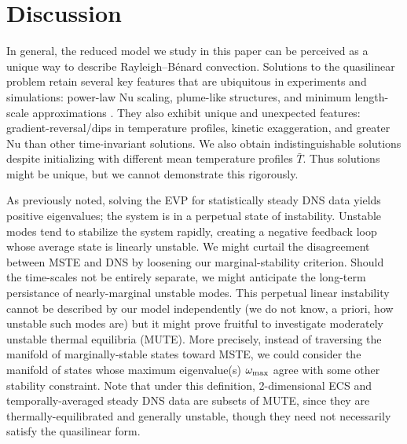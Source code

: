 \documentclass[reprint,amsmath,amssymb,aps]{revtex4-1}
\newcommand\Nu{\mathrm{Nu}}
\begin{document}
\section{Discussion}\label{sec:Discussion}
In general, the reduced model we study in this paper can be perceived as a unique way to describe Rayleigh–Bénard convection. 
Solutions to the quasilinear problem retain several key features that are ubiquitous in experiments and simulations: power-law $\Nu$ scaling, plume-like structures, and minimum length-scale approximations \cite{Malkus_1954}. 
They also exhibit unique and unexpected features: gradient-reversal/dips in temperature profiles, kinetic exaggeration, and greater $\Nu$ than other time-invariant solutions. 
We also obtain indistinguishable solutions despite initializing with different mean temperature profiles $\bar{T}$. 
Thus solutions might be unique, but we cannot demonstrate this rigorously.

As previously noted, solving the EVP for statistically steady DNS data yields positive eigenvalues; the system is in a perpetual state of instability. 
Unstable modes tend to stabilize the system rapidly, creating a negative feedback loop whose average state is linearly unstable. 
We might curtail the disagreement between MSTE and DNS by loosening our marginal-stability criterion. 
Should the time-scales not be entirely separate, we might anticipate the long-term persistance of nearly-marginal unstable modes. 
This perpetual linear instability cannot be described by our model independently (we do not know, a priori, how unstable such modes are) but it might prove fruitful to investigate moderately unstable thermal equilibria (MUTE). 
More precisely, instead of traversing the manifold of marginally-stable states toward MSTE, we could consider the manifold of states whose maximum eigenvalue(s) $\omega_{\rm{max}}$ agree with some other stability constraint. 
Note that under this definition, 2-dimensional ECS and temporally-averaged steady DNS data are subsets of MUTE, since they are thermally-equilibrated and generally unstable, though they need not necessarily satisfy the quasilinear form.
\end{document}
